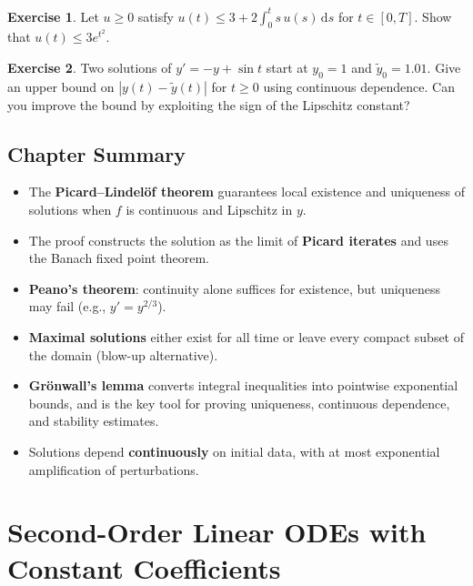 \documentclass[12pt,a4paper,openany]{book}
\theoremstyle{definition}
\newtheorem{exercise}{Exercise}[chapter]
\theoremstyle{plain}
\theoremstyle{remark}
\newcommand{\dd}{\mathrm{d}}
\newcommand{\abs}[1]{\left|#1\right|}
\begin{document}
\begin{exercise}\label{exer:gronwall-sharpen}
Let $u \ge 0$ satisfy $u(t) \le 3 + 2\displaystyle\int_0^t s\,u(s)\,\dd s$
for $t \in [0, T]$. Show that $u(t) \le 3 e^{t^2}$.
\end{exercise}

\begin{exercise}\label{exer:cont-dep-quantitative}
Two solutions of $y' = -y + \sin t$ start at $y_0 = 1$ and
$\tilde{y}_0 = 1.01$. Give an upper bound on $\abs{y(t) - \tilde{y}(t)}$
for $t \ge 0$ using continuous dependence. Can you improve the bound by
exploiting the sign of the Lipschitz constant?
\end{exercise}

\section{Chapter Summary}\label{sec:ch3-summary}

\begin{itemize}
  \item The \textbf{Picard--Lindel\"of theorem} guarantees local existence and
    uniqueness of solutions when $f$ is continuous and Lipschitz in $y$.
  \item The proof constructs the solution as the limit of \textbf{Picard
    iterates} and uses the Banach fixed point theorem.
  \item \textbf{Peano's theorem}: continuity alone suffices for existence, but
    uniqueness may fail (e.g., $y' = y^{2/3}$).
  \item \textbf{Maximal solutions} either exist for all time or leave every
    compact subset of the domain (blow-up alternative).
  \item \textbf{Gr\"onwall's lemma} converts integral inequalities into
    pointwise exponential bounds, and is the key tool for proving uniqueness,
    continuous dependence, and stability estimates.
  \item Solutions depend \textbf{continuously} on initial data, with at most
    exponential amplification of perturbations.
\end{itemize}


\chapter{Second-Order Linear ODEs with Constant Coefficients}\label{ch:second-order}
\end{document}
